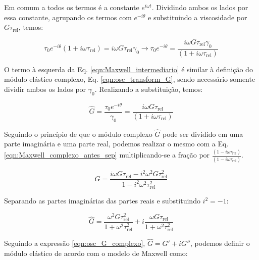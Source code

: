 			Em comum a todos os termos é a constante \(e^{i\omega t}\). Dividindo ambos os lados por essa constante, agrupando os termos com \(e^{-i\theta}\) e substituindo a viscosidade por \(G\tau_{\textrm{rel}}\), temos:
			
			\begin{equation}
				\tau_0e^{-i\theta} \left(   1 + i\omega\tau_{\textrm{rel}}  \right) = i\omega G\tau_{\textrm{rel}}\gamma_0 \to
				\tau_0e^{-i\theta} = \dfrac{i\omega G\tau_{\textrm{rel}}\gamma_0}{\left(   1 + i\omega\tau_{\textrm{rel}}  \right)}
				\label{eqn:Maxwell_intermediario}
			\end{equation}
			
			O termo à esquerda da Eq. \ref{eqn:Maxwell_intermediario} é similar à definição do módulo elástico complexo, Eq. \ref{eqn:osc_transform_G}, sendo necessário somente dividir ambos os lados por \(\gamma_0\). Realizando a substituição, temos:
			
			\begin{equation}
				\hat{G} = \dfrac{\tau_0e^{-i\theta}}{\gamma_0} = \dfrac{i\omega G\tau_{\textrm{rel}}}{\left(   1 + i\omega\tau_{\textrm{rel}}  \right)}
				\label{eqn:Maxwell_complexo_antes_sep}
			\end{equation}
			
			Seguindo o princípio de que o módulo complexo \(\hat{G}\) pode ser dividido em uma parte imaginária e uma parte real, podemos realizar o mesmo com a Eq. \ref{eqn:Maxwell_complexo_antes_sep} multiplicando-se a fração por \(\frac{\left(   1 - i\omega\tau_{\textrm{rel}}  \right)}{\left(   1 - i\omega\tau_{\textrm{rel}}  \right)}\).
			
			\begin{equation}
				\hat{G} = \dfrac{  i\omega G\tau_{\textrm{rel}} - i^2 \omega^2 G \tau_{\textrm{rel}}^2        }{  1 - i^2\omega^2 \tau_{\textrm{rel}}^2          }
				\label{eqn:Maxwell_complexo_antes_sep2}
			\end{equation}
			
			Separando as partes imaginárias das partes reais e substituindo \(i^2 = -1\):
			
			\begin{equation}
				\hat{G} = \dfrac{   \omega^2 G \tau_{\textrm{rel}}^2       }{  1 + \omega^2 \tau_{\textrm{rel}}^2      } + i \dfrac{   \omega G \tau_{\textrm{rel}}        }{ 1 + \omega^2 \tau_{\textrm{rel}}^2 }
				\label{eqn:Maxwell_substituido}
			\end{equation}
			
			Seguindo a expressão \ref{eqn:osc_G_complexo}, \(\hat{G} = G' + iG''\), podemos definir o módulo elástico de acordo com o modelo de Maxwell como:
			
